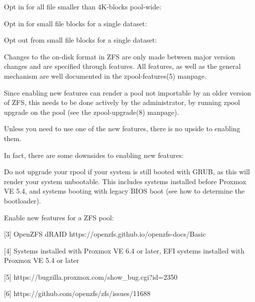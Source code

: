 Opt in for all file smaller than 4K-blocks pool-wide:

Opt in for small file blocks for a single dataset:

Opt out from small file blocks for a single dataset:

Changes to the on-disk format in ZFS are only made between major version changes and are specified through features. All features, as well as the general mechanism are well documented in the zpool-features(5) manpage.

Since enabling new features can render a pool not importable by an older version of ZFS, this needs to be done actively by the administrator, by running zpool upgrade on the pool (see the zpool-upgrade(8) manpage).

Unless you need to use one of the new features, there is no upside to enabling them.

In fact, there are some downsides to enabling new features:

Do not upgrade your rpool if your system is still booted with GRUB, as this will render your system unbootable. This includes systems installed before Proxmox VE 5.4, and systems booting with legacy BIOS boot (see how to determine the bootloader).

Enable new features for a ZFS pool:

[3] OpenZFS dRAID https://openzfs.github.io/openzfs-docs/Basic%

[4] Systems installed with Proxmox VE 6.4 or later, EFI systems installed with Proxmox VE 5.4 or later

[5] https://bugzilla.proxmox.com/show_bug.cgi?id=2350

[6] https://github.com/openzfs/zfs/issues/11688


